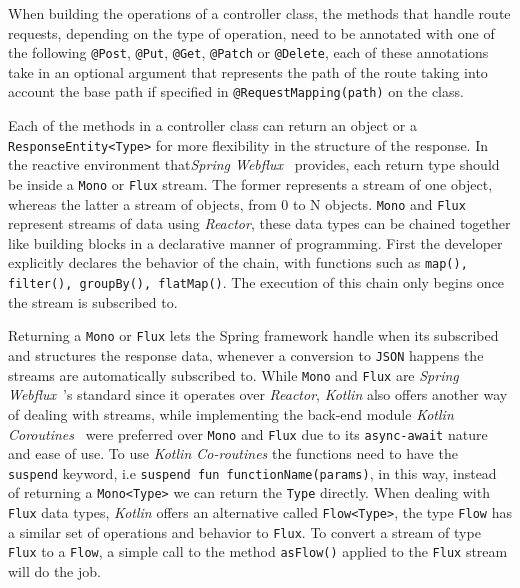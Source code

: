 When building the operations of a controller class, the methods that handle route requests, depending on the type of operation, need to be annotated with one of the following \lstinline{@Post}, \lstinline{@Put}, \lstinline{@Get}, \lstinline{@Patch} or \lstinline{@Delete}, each of these annotations take in an optional argument that represents the path of the route taking into account the base path if specified in \lstinline{@RequestMapping(path)} on the class. 

Each of the methods in a controller class can return an object or a \lstinline{ResponseEntity<Type>} for more flexibility in the structure of the response. In the reactive environment that\textit{Spring Webflux}~\cite{spring-webflux} provides, each return type should be inside a \texttt{Mono} or \texttt{Flux} stream.
The former represents a stream of one object, whereas the latter a stream of objects, from 0 to N objects. \texttt{Mono} and \texttt{Flux} represent streams of data using \textit{Reactor}, these data types can be chained together like building blocks in a declarative manner of programming. First the developer explicitly declares the behavior of the chain, with functions such as \lstinline{map(), filter(), groupBy(), flatMap()}. The execution of this chain only begins once the stream is subscribed to. 

Returning a \texttt{Mono} or \texttt{Flux} lets the Spring framework handle when its subscribed and structures the response data, whenever a conversion to \texttt{JSON} happens the streams are automatically subscribed to.
While \texttt{Mono} and \texttt{Flux} are \textit{Spring Webflux}~\cite{spring-webflux}'s standard since it operates over \textit{Reactor}, \textit{Kotlin} also offers another way of dealing with streams, while implementing the back-end module \textit{Kotlin Coroutines}~\cite{kotlin-coroutines} were preferred over \texttt{Mono} and \texttt{Flux} due to its \texttt{async-await} nature and ease of use. To use \textit{Kotlin Co-routines} the functions need to have the \texttt{suspend} keyword, i.e \lstinline{suspend fun functionName(params)}, in this way, instead of returning a \lstinline{Mono<Type>} we can return the \texttt{Type} directly. When dealing with \texttt{Flux} data types, \textit{Kotlin} offers an alternative called \lstinline{Flow<Type>}, the type \texttt{Flow} has a similar set of operations and behavior to \texttt{Flux}. To convert a stream of type \texttt{Flux} to a \texttt{Flow}, a simple call to the method \lstinline{asFlow()} applied to the \lstinline{Flux} stream will do the job.

